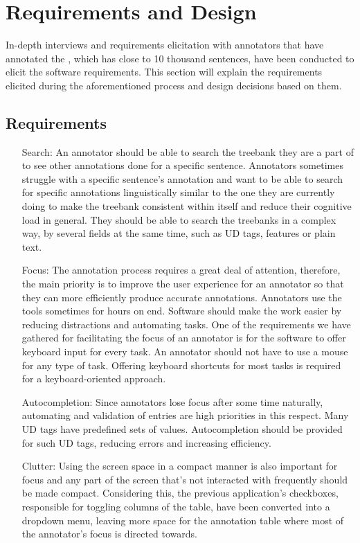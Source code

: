 \section{Requirements and Design}
\label{sec:requirements}

In-depth interviews and requirements elicitation with annotators that have annotated the \bountreebank{}, which has close to 10 thousand sentences, have been conducted to elicit the software requirements.
This section will explain the requirements elicited during the aforementioned process and design decisions based on them.

\subsection{Requirements}
\begin{itemize}[before=\normalfont, font=\itshape, align=left]
\item[Search:]
An annotator should be able to search the treebank they are a part of to see other annotations done for a specific sentence.
Annotators sometimes struggle with a specific sentence's annotation and want to be able to search for specific annotations linguistically similar to the one they are currently doing to make the treebank consistent within itself and reduce their cognitive load in general.
They should be able to search the treebanks in a complex way, by several fields at the same time, such as UD tags, features or plain text.

\item[Focus:]
The annotation process requires a great deal of attention, therefore, the main priority is to improve the user experience for an annotator so that they can more efficiently produce accurate annotations.
Annotators use the tools sometimes for hours on end.
Software should make the work easier by reducing distractions and automating tasks.
One of the requirements we have gathered for facilitating the focus of an annotator is for the software to offer keyboard input for every task.
An annotator should not have to use a mouse for any type of task.
Offering keyboard shortcuts for most tasks is required for a keyboard-oriented approach.

\item[Autocompletion:]
Since annotators lose focus after some time naturally, automating and validation of entries are high priorities in this respect.
Many UD tags have predefined sets of values.
Autocompletion should be provided for such UD tags, reducing errors and increasing efficiency.

\item[Clutter:]
Using the screen space in a compact manner is also important for focus and any part of the screen that's not interacted with frequently should be made compact.
Considering this, the previous application's checkboxes, responsible for toggling columns of the table, have been converted into a dropdown menu, leaving more space for the annotation table where most of the annotator's focus is directed towards.
\end{itemize}


